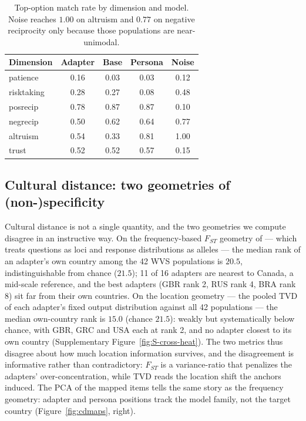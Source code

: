 \documentclass[10pt,letterpaper]{article}
\begin{document}
\begin{table}[H]
\centering\small
\caption{Top-option match rate by dimension and model. Noise reaches $1.00$ on altruism and $0.77$ on negative reciprocity only because those populations are near-unimodal.}\label{tab:res-direction}
\begin{tabular}{lcccc}
\toprule
Dimension & Adapter & Base & Persona & Noise\\
\midrule
patience & 0.16 & 0.03 & 0.03 & 0.12\\
risktaking & 0.28 & 0.27 & 0.08 & 0.48\\
posrecip & 0.78 & 0.87 & 0.87 & 0.10\\
negrecip & 0.50 & 0.62 & 0.64 & 0.77\\
altruism & 0.54 & 0.33 & 0.81 & 1.00\\
trust & 0.52 & 0.52 & 0.57 & 0.15\\
\bottomrule
\end{tabular}
\end{table}

\subsection{Cultural distance: two geometries of (non-)specificity}
Cultural distance is not a single quantity, and the two geometries we compute disagree in an instructive way. On the frequency-based $F_{ST}$ geometry of \cite{muthukrishna2020} --- which treats questions as loci and response distributions as alleles --- the median rank of an adapter's own country among the 42 WVS populations is $20.5$, indistinguishable from chance ($21.5$); 11 of 16 adapters are nearest to Canada, a mid-scale reference, and the best adapters (GBR rank 2, RUS rank 4, BRA rank 8) sit far from their own countries. On the location geometry --- the pooled TVD of each adapter's fixed output distribution against all 42 populations --- the median own-country rank is $15.0$ (chance $21.5$): weakly but systematically below chance, with GBR, GRC and USA each at rank 2, and no adapter closest to its own country (Supplementary Figure~\ref{fig:S-cross-heat}). The two metrics thus disagree about how much location information survives, and the disagreement is informative rather than contradictory: $F_{ST}$ is a variance-ratio that penalizes the adapters' over-concentration, while TVD reads the location shift the anchors induced. The PCA of the mapped items tells the same story as the frequency geometry: adapter and persona positions track the model family, not the target country (Figure~\ref{fig:cdmaps}, right).
\end{document}
